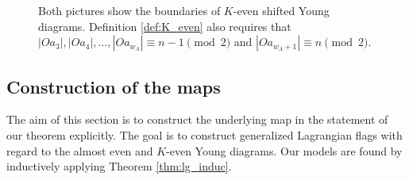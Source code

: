 \documentclass[a4paper]{amsart}
\theoremstyle{plain}
\theoremstyle{definition}
\numberwithin{equation}{section}
\begin{document}
\begin{figure}[!ht]
    \caption{Both pictures show the boundaries of $K$-even shifted Young diagrams. Definition \ref{def:K_even} also requires that $|Oa_{3}|, |Oa_{4}|, \ldots, |Oa_{w_\Lambda}|\equiv n-1 \pmod 2$
    and $ |Oa_{w_\Lambda+1}| \equiv n \pmod 2$.}
    \label{fig:K_even}
\end{figure}

\subsection{Construction of the maps} The aim of this section is to construct the underlying map in the statement of our theorem explicitly. The goal is to construct generalized Lagrangian flags with regard to the almost even and $K$-even Young diagrams. Our models are found by inductively applying Theorem \ref{thm:lg_induc}.
\end{document}
